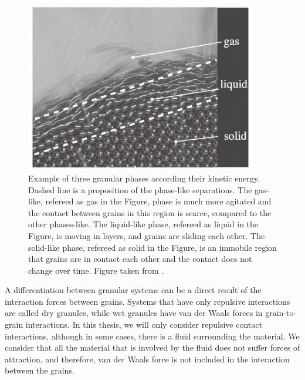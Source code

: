     \begin{figure}
        \centering
        \includegraphics[width=0.9\textwidth]{04-figuras/Exemplo_Fases.png}
        \caption[Granular phases.]{Example of three granular phases according their kinetic energy. Dashed line is a proposition of the phase-like separations. The gas-like, refereed as gas in the Figure, phase is much more agitated and the contact between grains in this region is scarce, compared to the other phases-like. The liquid-like phase, refereed as liquid in the Figure, is moving in layers, and grains are sliding each other. The solid-like phase, refereed as solid in the Figure, is an immobile region that grains are in contact each other and the contact does not change over time. Figure taken from \cite{Granular_Media_Between_Fluid_and_Solid}.}
        \label{fig:exemplo_fases}
    \end{figure}

    A differentiation between granular systems can be a direct result of the interaction forces between grains. Systems that have only repulsive interactions are called dry granules, while wet granules have van der Waals forces in grain-to-grain interactions. In this thesis, we will only consider repulsive contact interactions, although in some cases, there is a fluid surrounding the material. We consider that all the material that is involved by the fluid does not suffer forces of attraction, and therefore, van der Waals force is not included in the interaction between the grains.

